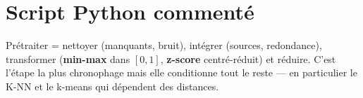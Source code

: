 \section{Script Python commenté}


\begin{Resume}
Prétraiter = nettoyer (manquants, bruit), intégrer (sources, redondance), transformer
(\textbf{min-max} dans $[0,1]$, \textbf{z-score} centré-réduit) et réduire. C'est l'étape la
plus chronophage mais elle conditionne tout le reste — en particulier le K-NN et le k-means
qui dépendent des distances.
\end{Resume}
